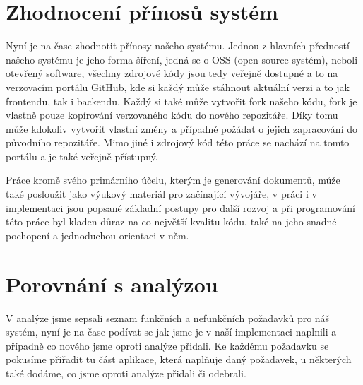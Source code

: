 \section{Zhodnocení přínosů systém}

Nyní je na čase zhodnotit přínosy našeho systému. Jednou z hlavních předností našeho systému je jeho
forma šíření, jedná se o OSS (open source systém), neboli otevřený software, všechny zdrojové kódy
jsou tedy veřejně dostupné a to na verzovacím portálu GitHub, kde si každý může stáhnout aktuální
verzi a to jak frontendu, tak i backendu. Každý si také může vytvořit fork našeho kódu, fork je vlastně
pouze kopírování verzovaného kódu do nového repozitáře. Díky tomu může kdokoliv vytvořit vlastní změny
a případně požádat o jejich zapracování do původního repozitáře. Mimo jiné i zdrojový kód této práce
se nachází na tomto portálu a je také veřejně přístupný.

Práce kromě svého primárního účelu, kterým je generování dokumentů, může také posloužit jako výukový materiál
pro začínající vývojáře, v práci i v implementaci jsou popsané základní postupy pro další rozvoj a při programování
této práce byl kladen důraz na co největší kvalitu kódu, také na jeho snadné pochopení a jednoduchou orientaci v něm.

\section{Porovnání s analýzou}

V analýze jsme sepsali seznam funkčních a nefunkčních požadavků pro náš systém, nyní je na čase podívat se
jak jsme je v naší implementaci naplnili a případně co nového jsme oproti analýze přidali. Ke každému požadavku
se pokusíme přiřadit tu část aplikace, která naplňuje daný požadavek, u některých také dodáme, co jsme oproti analýze
přidali či odebrali.

